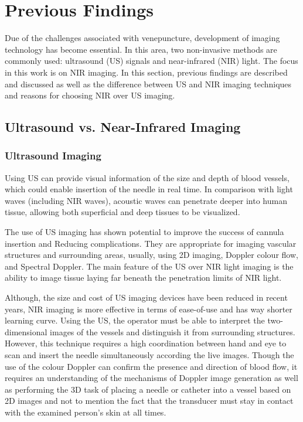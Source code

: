 \section{Previous Findings}

Due of the challenges associated with venepuncture, development of imaging technology has become essential. In this area, two non-invasive methods are commonly used: ultrasound (US) signals and near-infrared (NIR) light. The focus in this work is on NIR imaging.
In this section, previous findings are described and discussed as well as the difference between US and NIR imaging techniques and reasons for choosing NIR over US imaging.

\subsection{Ultrasound vs. Near-Infrared Imaging}

\subsubsection{Ultrasound Imaging}
Using US can provide visual information of the size and depth of blood vessels, which could enable insertion of the needle in real time. In comparison with light waves (including NIR waves), acoustic waves can penetrate deeper into human tissue, allowing both superficial and deep tissues to be visualized. 

The use of US imaging has shown potential to improve the success of cannula insertion and Reducing complications. They are appropriate for imaging vascular structures and surrounding areas, usually, using 2D imaging, Doppler colour flow, and Spectral Doppler. The main feature of the US over NIR light imaging is the ability to image tissue laying far beneath the penetration limits of NIR light. 

Although, the size and cost of US imaging devices have been reduced in recent years, NIR imaging is more effective in terms of ease-of-use and has way shorter learning curve. Using the US, the operator must be able to interpret the two-dimensional images of the vessels and distinguish it from surrounding structures. However, this technique requires a high coordination between hand and eye to scan and insert the needle simultaneously according the live images. Though the use of the colour Doppler can confirm the presence and direction of blood flow, it requires an understanding of the mechanisms of Doppler image generation as well as performing the 3D task of placing a needle or catheter into a vessel based on 2D images and not to mention the fact that the transducer must stay in contact with the examined person’s skin at all times.


